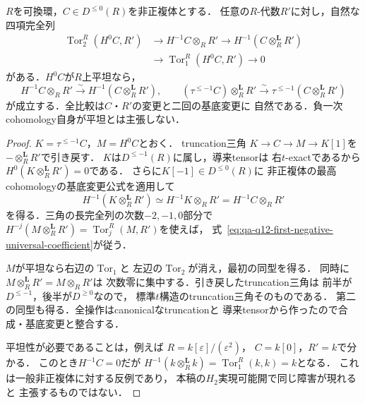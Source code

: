 \begin{lemma}[非正複体の負一次cohomologyの基底変更]
\label{lem:qa-q12-first-negative-universal-coefficient}
$R$を可換環，$C\in D^{\leq0}(R)$を非正複体とする．
任意の$R$-代数$R'$に対し，自然な四項完全列
\[
 \begin{split}
 \operatorname{Tor}_2^R(H^0C,R')
 &\longrightarrow H^{-1}C\otimes_RR'
 \longrightarrow H^{-1}(C\otimes_R^{\mathbf L}R')\\
 &\longrightarrow
 \operatorname{Tor}_1^R(H^0C,R')\longrightarrow0
 \end{split}
 \tag{UC}\label{eq:qa-q12-first-negative-universal-coefficient}
\]
がある．$H^0C$が$R$上平坦なら，
\[
 H^{-1}C\otimes_RR'
 \xrightarrow{\sim}H^{-1}(C\otimes_R^{\mathbf L}R'),
 \qquad
 (\tau^{\leq-1}C)\otimes_R^{\mathbf L}R'
 \xrightarrow{\sim}
 \tau^{\leq-1}(C\otimes_R^{\mathbf L}R')
 \tag{NC}\label{eq:qa-q12-negative-truncation-base-change}
\]
が成立する．全比較は$C$・$R'$の変更と二回の基底変更に
自然である．負一次cohomology自身が平坦とは主張しない．
\end{lemma}
\begin{proof}
$K=\tau^{\leq-1}C$，$M=H^0C$とおく．
truncation三角
$K\to C\to M\to K[1]$を
$-\otimes_R^{\mathbf L}R'$で引き戻す．
$K$は$D^{\leq-1}(R)$に属し，導来tensorは
右$t$-exactであるから
$H^0(K\otimes_R^{\mathbf L}R')=0$である．
さらに$K[-1]\in D^{\leq0}(R)$に
非正複体の最高cohomologyの基底変更公式を適用して
\[
 H^{-1}(K\otimes_R^{\mathbf L}R')
 \simeq H^{-1}K\otimes_RR'
 =H^{-1}C\otimes_RR'
\]
を得る．三角の長完全列の次数$-2,-1,0$部分で
$H^{-j}(M\otimes_R^{\mathbf L}R')
=\operatorname{Tor}_j^R(M,R')$を使えば，
式~\eqref{eq:qa-q12-first-negative-universal-coefficient}が従う．

$M$が平坦なら右辺の$\operatorname{Tor}_1$と
左辺の$\operatorname{Tor}_2$が消え，最初の同型を得る．
同時に$M\otimes_R^{\mathbf L}R'=M\otimes_RR'$は
次数零に集中する．引き戻したtruncation三角は
前半が$D^{\leq-1}$，後半が$D^{\geq0}$なので，
標準$t$構造のtruncation三角そのものである．
第二の同型も得る．全操作はcanonicalなtruncationと
導来tensorから作ったので合成・基底変更と整合する．

平坦性が必要であることは，例えば
$R=k[\varepsilon]/(\varepsilon^2)$，
$C=k[0]$，$R'=k$で分かる．
このとき$H^{-1}C=0$だが
$H^{-1}(k\otimes_R^{\mathbf L}k)
=\operatorname{Tor}_1^R(k,k)=k$となる．
これは一般非正複体に対する反例であり，
本稿の$H_2$実現可能開で同じ障害が現れると
主張するものではない．
\end{proof}

